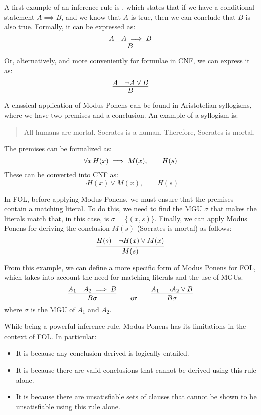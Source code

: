 A first example of an inference rule is , which states that if we have a conditional statement \(A \implies B\), and we know that \(A\) is true, then we can conclude that \(B\) is also true. Formally, it can be expressed as:
\begin{equation}  
  \infer{B}{A & A \implies B}
\end{equation}


Or, alternatively, and more conveniently for formulae in CNF, we can express it as:
\begin{equation}  
  \infer{B}{A & \neg A \lor B}
\end{equation}

A classical application of Modus Ponens can be found in Aristotelian syllogisms, where we have two premises and a conclusion.
An example of a syllogism is:
\begin{quote}
  All humans are mortal. Socrates is a human. Therefore, Socrates is mortal.
\end{quote}
The premises can be formalized as:
\begin{equation}
  \forall x \, H(x) \implies M(x), \qquad H(s)
\end{equation}
These can be converted into CNF as:
\begin{equation}
    \neg H(x) \lor M(x), \qquad H(s)
\end{equation}

In FOL, before applying Modus Ponens, we must ensure that the premises contain a matching literal. To do this, we need to find the MGU \(\sigma\) that makes the literals match that, in this case, is \(\sigma = \{(x,s)\}\).
Finally, we can apply Modus Ponens for deriving the conclusion \(M(s)\) (Socrates is mortal) as follows:
\begin{equation}
  \infer{M(s)}{H(s) & \neg H(x) \lor M(x)}
\end{equation}

From this example, we can define a more specific form of Modus Ponens for FOL, which takes into account the need for matching literals and the use of MGUs.
\begin{equation}  
  \infer{B\sigma}{A_1 & A_2 \implies B} \qquad \text{or} \qquad \infer{B\sigma}{A_1 & \neg A_2 \lor B}
\end{equation}
where \(\sigma\) is the MGU of \(A_1\) and \(A_2\).

While being a powerful inference rule, Modus Ponens has its limitations in the context of FOL\@.
In particular:
\begin{itemize}
  \item It is  because any conclusion derived is logically entailed.
  \item It is  because there are valid conclusions that cannot be derived using this rule alone.
  \item It is  because there are unsatisfiable sets of clauses that cannot be shown to be unsatisfiable using this rule alone.
\end{itemize}

